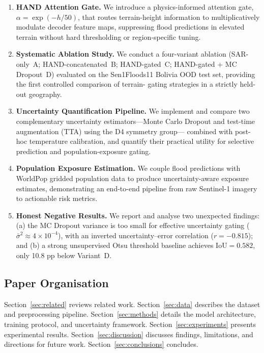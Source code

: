 \documentclass[12pt]{article}
\newcommand{\IoU}{\mathrm{IoU}}
\begin{document}
\begin{enumerate}
  \item \textbf{HAND Attention Gate.}  We introduce a physics-informed
        attention gate, $\alpha = \exp(-h/50)$, that routes terrain-height
        information to multiplicatively modulate decoder feature maps,
        suppressing flood predictions in elevated terrain without hard
        thresholding or region-specific tuning.

  \item \textbf{Systematic Ablation Study.}  We conduct a four-variant
        ablation (SAR-only~A; HAND-concatenated~B; HAND-gated~C;
        HAND-gated + MC Dropout~D) evaluated on the Sen1Floods11 Bolivia
        OOD test set, providing the first controlled comparison of terrain-
        gating strategies in a strictly held-out geography.

  \item \textbf{Uncertainty Quantification Pipeline.}  We implement and
        compare two complementary uncertainty estimators—Monte Carlo Dropout
        and test-time augmentation (TTA) using the D4 symmetry group—
        combined with post-hoc temperature calibration, and quantify their
        practical utility for selective prediction and population-exposure
        gating.

  \item \textbf{Population Exposure Estimation.}  We couple flood predictions
        with WorldPop gridded population data to produce uncertainty-aware
        exposure estimates, demonstrating an end-to-end pipeline from raw
        Sentinel-1 imagery to actionable risk metrics.

  \item \textbf{Honest Negative Results.}  We report and analyse two
        unexpected findings: (a) the MC Dropout variance is too small for
        effective uncertainty gating ($\bar{\sigma}^2 \approx 4 \times
        10^{-4}$), with an inverted uncertainty–error correlation
        ($r = -0.815$); and (b) a strong unsupervised Otsu threshold baseline
        achieves $\IoU = 0.582$, only 10.8 pp below Variant~D.
\end{enumerate}

\subsection{Paper Organisation}

Section~\ref{sec:related} reviews related work.  Section~\ref{sec:data}
describes the dataset and preprocessing pipeline.  Section~\ref{sec:methods}
details the model architecture, training protocol, and uncertainty framework.
Section~\ref{sec:experiments} presents experimental results.
Section~\ref{sec:discussion} discusses findings, limitations, and directions
for future work.  Section~\ref{sec:conclusions} concludes.
\end{document}
